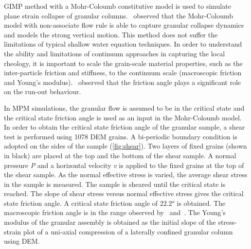 GIMP method with a Mohr-Coloumb constitutive model is used to simulate plane 
strain 
collapse of granular columns.~\citet{Crosta2009a} observed that the 
Mohr-Coloumb 
model with non-associate flow rule is able to capture granular collapse 
dynamics and models the strong vertical motion. This method does not suffer 
the limitations of typical shallow water equation techniques. In order to 
understand the ability and limitations of continuum approaches in capturing the 
local rheology, it is important to scale the grain-scale material properties, 
such as the inter-particle friction and stiffness, to the continuum scale 
(macroscopic friction and Young's modulus).~\citet{Crosta2009a} observed that 
the friction angle plays a significant role on the run-out behaviour. 

In MPM simulations, the granular flow is assumed to be in the critical state 
and the critical state friction angle is used as an input in the Mohr-Coloumb 
model. In order to obtain the critical state friction angle of the granular 
sample, a shear test is performed using 1078 DEM grains. A bi-periodic boundary 
condition is adopted on the sides of the sample (\cref{fig:shear}). Two layers 
of fixed grains (shown in black) are placed at the top and the bottom of the 
shear sample. A normal pressure \textit{P} and a horizontal velocity \textit{v} 
is applied to the fixed grains  at the top of the shear sample. As the normal 
effective stress is varied, the average shear stress in the sample is measured. 
The sample is sheared until the critical state is reached. The slope of shear 
stress versus normal effective stress gives the critical state friction angle. 
A critical state friction angle of $22.2$\si{\degree} is obtained. The 
macroscopic friction angle is in the range observed by~\citet{Estrada2008} 
and~\citet{Mitchell2005}. The Young's modulus of the granular assembly is 
obtained as the initial slope of the stress-strain plot of a uni-axial 
compression of a laterally confined granular column using DEM.

